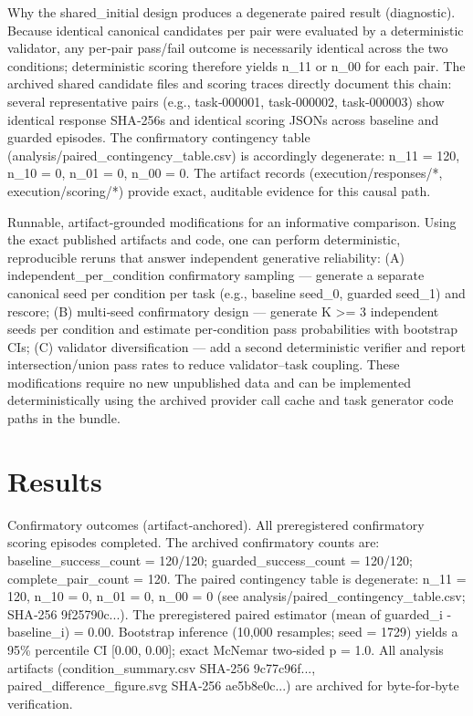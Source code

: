 \documentclass[conference]{IEEEtran}
\begin{document}
Why the shared\_initial design produces a degenerate paired result (diagnostic). Because identical canonical candidates per pair were evaluated by a deterministic validator, any per‑pair pass/fail outcome is necessarily identical across the two conditions; deterministic scoring therefore yields n\_11 or n\_00 for each pair. The archived shared candidate files and scoring traces directly document this chain: several representative pairs (e.g., task‑000001, task‑000002, task‑000003) show identical response SHA‑256s and identical scoring JSONs across baseline and guarded episodes. The confirmatory contingency table (analysis/paired\_contingency\_table.csv) is accordingly degenerate: n\_11 = 120, n\_10 = 0, n\_01 = 0, n\_00 = 0. The artifact records (execution/responses/*, execution/scoring/*) provide exact, auditable evidence for this causal path.

Runnable, artifact‑grounded modifications for an informative comparison. Using the exact published artifacts and code, one can perform deterministic, reproducible reruns that answer independent generative reliability: (A) independent\_per\_condition confirmatory sampling --- generate a separate canonical seed per condition per task (e.g., baseline seed\_0, guarded seed\_1) and rescore; (B) multi‑seed confirmatory design --- generate K >= 3 independent seeds per condition and estimate per‑condition pass probabilities with bootstrap CIs; (C) validator diversification --- add a second deterministic verifier and report intersection/union pass rates to reduce validator--task coupling. These modifications require no new unpublished data and can be implemented deterministically using the archived provider call cache and task generator code paths in the bundle.

\section{Results}
Confirmatory outcomes (artifact‑anchored). All preregistered confirmatory scoring episodes completed. The archived confirmatory counts are: baseline\_success\_count = 120/120; guarded\_success\_count = 120/120; complete\_pair\_count = 120. The paired contingency table is degenerate: n\_11 = 120, n\_10 = 0, n\_01 = 0, n\_00 = 0 (see analysis/paired\_contingency\_table.csv; SHA‑256 9f25790c...). The preregistered paired estimator (mean of guarded\_i - baseline\_i) = 0.00. Bootstrap inference (10,000 resamples; seed = 1729) yields a 95\% percentile CI [0.00, 0.00]; exact McNemar two‑sided p = 1.0. All analysis artifacts (condition\_summary.csv SHA‑256 9c77c96f..., paired\_difference\_figure.svg SHA‑256 ae5b8e0c...) are archived for byte‑for‑byte verification.
\end{document}

